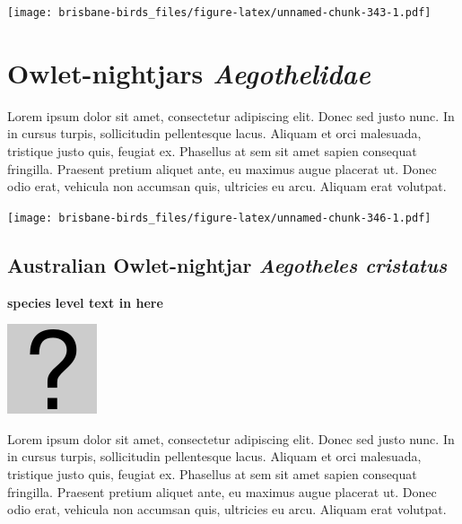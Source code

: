 \documentclass[]{book}
\let\origfigure\figure
\let\endorigfigure\endfigure
\renewenvironment{figure}[1][2] {
  \expandafter\origfigure\expandafter[H]
} {
  \endorigfigure
}
\begin{document}
\begin{figure}
\centering
\texttt{[image: brisbane-birds\_files/figure-latex/unnamed-chunk-343-1.pdf]}
\caption{\label{fig:unnamed-chunk-343}insert figure caption}
\end{figure}

\chapter{\texorpdfstring{Owlet-nightjars
\emph{Aegothelidae}}{Owlet-nightjars Aegothelidae}}\label{owlet-nightjars-aegothelidae}

Lorem ipsum dolor sit amet, consectetur adipiscing elit. Donec sed justo
nunc. In in cursus turpis, sollicitudin pellentesque lacus. Aliquam et
orci malesuada, tristique justo quis, feugiat ex. Phasellus at sem sit
amet sapien consequat fringilla. Praesent pretium aliquet ante, eu
maximus augue placerat ut. Donec odio erat, vehicula non accumsan quis,
ultricies eu arcu. Aliquam erat volutpat.

\texttt{[image: brisbane-birds\_files/figure-latex/unnamed-chunk-346-1.pdf]}

\section{\texorpdfstring{Australian Owlet-nightjar \emph{Aegotheles
cristatus}}{Australian Owlet-nightjar Aegotheles cristatus}}\label{australian-owlet-nightjar-aegotheles-cristatus}

\textbf{species level text in here}

\begin{figure}
\centering
\includegraphics{assets/missing.png}
\caption{No image for species}
\end{figure}

Lorem ipsum dolor sit amet, consectetur adipiscing elit. Donec sed justo
nunc. In in cursus turpis, sollicitudin pellentesque lacus. Aliquam et
orci malesuada, tristique justo quis, feugiat ex. Phasellus at sem sit
amet sapien consequat fringilla. Praesent pretium aliquet ante, eu
maximus augue placerat ut. Donec odio erat, vehicula non accumsan quis,
ultricies eu arcu. Aliquam erat volutpat.
\end{document}
